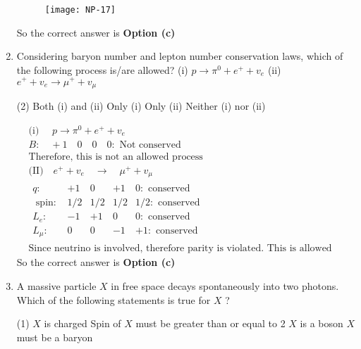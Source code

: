 \begin{enumerate}
\begin{answer}
		\begin{figure}[H]
			\centering
			\texttt{[image: NP-17]}
		\end{figure}
		So the correct answer is \textbf{Option (c)}
	\end{answer}
	\item  Considering baryon number and lepton number conservation laws, which of the following process is/are allowed?
	(i) $p \rightarrow \pi^0+e^{+}+v_e$\hspace{2cm}
	(ii) $e^{+}+v_e \rightarrow \mu^{+}+v_\mu$
	{}
	\begin{tasks}(2)
		\task[\textbf{a.}]Both (i) and (ii)
		\task[\textbf{b.}]Only (i)
		\task[\textbf{c.}]Only (ii)
		\task[\textbf{d.}]Neither (i) nor (ii)
	\end{tasks}
	\begin{answer}
		\begin{align*}
		&\text{(i) }\quad p \rightarrow \pi^0+e^{+}+v_e\\
		&B: \quad+1 \quad 0 \quad 0 \quad 0:\text{ Not conserved}\\ 
		&\text{Therefore, this is not an allowed process}\\
		&\text{(II)}\quad e^{+}+v_e \quad \rightarrow \quad \mu^{+}+v_\mu\\
		&\begin{array}{lclcc}
		q: & +1 & 0 & +1 & 0: \text { conserved } \\
		\text { spin: } & 1 / 2 & 1 / 2 & 1 / 2 & 1 / 2: \text { conserved } \\
		L_e: & -1 & +1 & 0 & 0: \text { conserved } \\
		L_\mu: & 0 & 0 & -1 & +1: \text { conserved }
		\end{array}\\
		&\text{Since neutrino is involved, therefore parity is violated. This is allowed through weak interaction.}
		\end{align*}
		So the correct answer is \textbf{Option (c)}
	\end{answer}
	\item  A massive particle $X$ in free space decays spontaneously into two photons. Which of the following statements is true for $X$ ?
	{}
	\begin{tasks}(1)
		\task[\textbf{a.}] $X$ is charged
		\task[\textbf{b.}]Spin of $X$ must be greater than or equal to 2
		\task[\textbf{c.}]$X$ is a boson
		\task[\textbf{d.}]$X$ must be a baryon 
	\end{tasks}

\end{enumerate}

